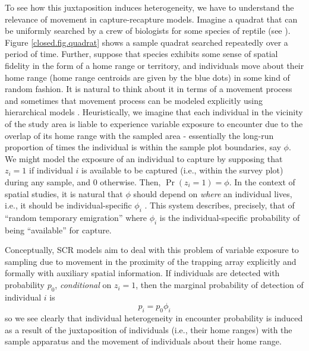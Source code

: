 To see how this juxtaposition induces heterogeneity, we have to
understand the relevance of movement in capture-recapture models.
Imagine a quadrat that can be uniformly searched by a crew of
biologists for some species of reptile (see
\citet{royle_young:2008}).  Figure \ref{closed.fig.quadrat} shows a
sample quadrat searched repeatedly over a period of time. Further,
suppose that species exhibits some sense of spatial fidelity in the
form of a home range or territory, and individuals move about their
home range (home range centroids are given by the blue dots) in some
kind of random fashion.  It is natural to think about it in terms of a
movement process and sometimes that movement process can be modeled
explicitly using hierarchical models \citep{royle_young:2008,
  royle_etal:2011mee}.  Heuristically, we imagine that each individual in
the vicinity of the study area is liable to experience variable
exposure to encounter due to the overlap of its home range with the
sampled area - essentially the long-run proportion of times the
individual is within the sample plot boundaries, say $\phi$. We
might model the exposure of an individual to capture by supposing that
$z_{i} = 1$ if individual $i$ is available to be captured (i.e.,
within the survey plot) during any sample, and $0$ otherwise. Then,
$\Pr(z_{i}=1) = \phi$.  In the context of spatial studies, it is
natural that $\phi$ should depend on {\it where} an individual lives,
i.e., it should be individual-specific $\phi_{i}$
\citep{chandler_etal:2011}. This system describes, precisely, that of
``random temporary emigration'' \citep{kendall_etal:1997} where $\phi_{i}$
is the individual-specific probability of being ``available'' for
capture.

Conceptually, SCR models aim to deal with
this problem of variable exposure to sampling due to movement in the
proximity of the trapping array explicitly and formally with auxiliary
spatial information.  If individuals are detected with probability
$p_{0}$, {\it conditional} on $z_{i} = 1$, then the marginal
probability of detection of individual $i$ is
\[
 p_{i} = p_{0}\phi_{i}
\]
so we see clearly that individual heterogeneity in encounter
probability is induced as a result of the juxtaposition of individuals
(i.e., their home ranges) with the sample apparatus and the movement
of individuals about their home range.

